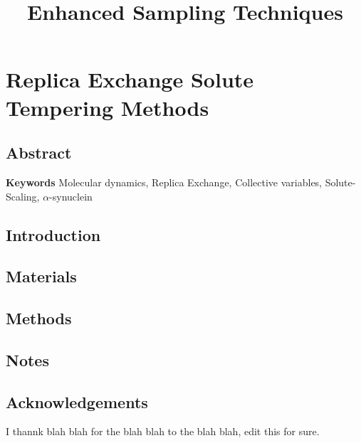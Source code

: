 \documentclass{memoir}
\title{Enhanced Sampling Techniques}
\begin{document}
\date{}

\maketitle

\tableofcontents

\chapter{Replica Exchange Solute Tempering Methods}

\section{Abstract}


\textbf{Keywords} Molecular dynamics, Replica Exchange, Collective variables, Solute-Scaling, $\alpha$-synuclein

\section{Introduction}

    





\section{Materials}



\section{Methods}





\section{Notes}






\section{Acknowledgements}
I thannk blah blah for the blah blah to the blah blah, edit this for sure.



\end{document}
